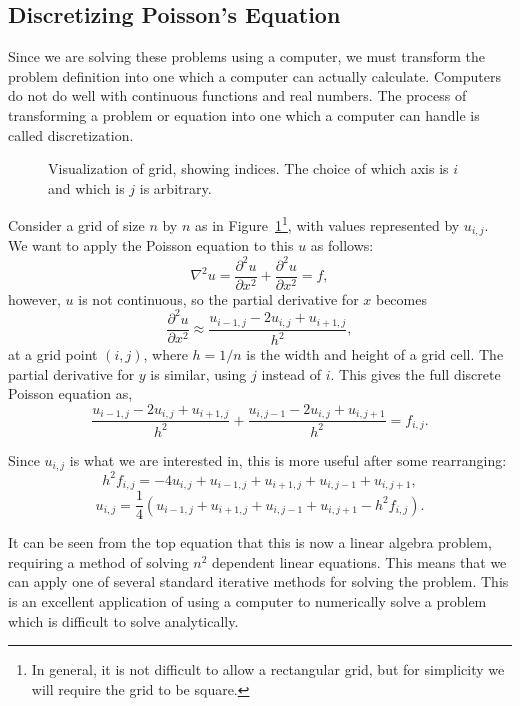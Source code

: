 \subsection{Discretizing Poisson's Equation}

Since we are solving these problems using a computer, we must transform the problem definition into one which a computer
can actually calculate. Computers do not do well with continuous functions and real numbers. The process of transforming
a problem or equation into one which a computer can handle is called discretization.

\begin{figure}[htb]
	\centering
	
	\caption[Visualization of grid, showing indices]{Visualization of grid, showing indices. The choice of which axis is $i$ and which is $j$ is arbitrary.}
\label{grid}
\end{figure}

Consider a grid of size $n$ by $n$ as in Figure~\ref{grid}\footnote{In general, it is not difficult to allow a rectangular grid, but for simplicity
we will require the grid to be square.}, with values represented by $u_{i,j}$. We want to apply the Poisson equation to
this $u$ as follows:
$$\nabla^2 u = \frac{\partial^2 u}{\partial x^2} + \frac{\partial^2 u}{\partial x^2} = f,$$
however, $u$ is not continuous, so the partial derivative for $x$ becomes
$$\frac{\partial^2 u}{\partial x^2} \approx \frac{u_{i-1,j} - 2 u_{i,j} + u_{i+1,j}}{h^2},$$
at a grid point $(i,j)$, where $h = 1 / n$ is the width and height of a grid cell. The partial derivative for $y$ is similar, using $j$ instead of $i$.
This gives the full discrete Poisson equation as\cite{poisson-relax}\cite{myths},
$$\frac{u_{i-1,j} - 2 u_{i,j} + u_{i+1,j}}{h^2} + \frac{u_{i,j-1} - 2 u_{i,j} + u_{i,j+1}}{h^2} = f_{i,j}.$$

Since $u_{i,j}$ is what we are interested in, this is more useful after some rearranging:
$$h^2f_{i,j} = -4u_{i,j} + u_{i-1,j} + u_{i+1,j} + u_{i,j-1} + u_{i,j+1},$$
\begin{equation} \label{eq:poisson}
u_{i,j} = \frac{1}{4}(u_{i-1,j} + u_{i+1,j} + u_{i,j-1} + u_{i,j+1} - h^2f_{i,j}).
\end{equation}

It can be seen from the top equation that this is now a linear algebra problem, requiring a method of solving
$n^2$ dependent linear equations. This means that we can apply one of several standard iterative methods
for solving the problem. This is an excellent application of using a computer to numerically solve a problem
	which is difficult to solve analytically.


